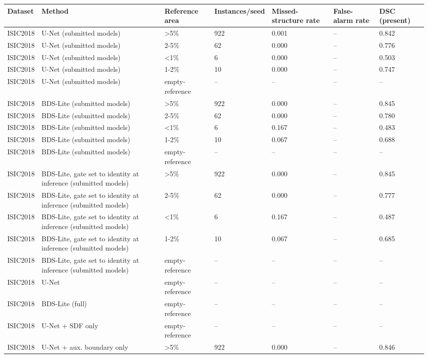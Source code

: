 \begin{tabular}{lllllll}
\toprule
Dataset & Method & Reference area & Instances/seed & Missed-structure rate & False-alarm rate & DSC (present) \\
\midrule
ISIC2018 & U-Net (submitted models) & >5\% & 922 & 0.001 & -- & 0.842 \\
ISIC2018 & U-Net (submitted models) & 2-5\% & 62 & 0.000 & -- & 0.776 \\
ISIC2018 & U-Net (submitted models) & <1\% & 6 & 0.000 & -- & 0.503 \\
ISIC2018 & U-Net (submitted models) & 1-2\% & 10 & 0.000 & -- & 0.747 \\
ISIC2018 & U-Net (submitted models) & empty-reference & -- & -- & -- & -- \\
ISIC2018 & BDS-Lite (submitted models) & >5\% & 922 & 0.000 & -- & 0.845 \\
ISIC2018 & BDS-Lite (submitted models) & 2-5\% & 62 & 0.000 & -- & 0.780 \\
ISIC2018 & BDS-Lite (submitted models) & <1\% & 6 & 0.167 & -- & 0.483 \\
ISIC2018 & BDS-Lite (submitted models) & 1-2\% & 10 & 0.067 & -- & 0.688 \\
ISIC2018 & BDS-Lite (submitted models) & empty-reference & -- & -- & -- & -- \\
ISIC2018 & BDS-Lite, gate set to identity at inference (submitted models) & >5\% & 922 & 0.000 & -- & 0.845 \\
ISIC2018 & BDS-Lite, gate set to identity at inference (submitted models) & 2-5\% & 62 & 0.000 & -- & 0.777 \\
ISIC2018 & BDS-Lite, gate set to identity at inference (submitted models) & <1\% & 6 & 0.167 & -- & 0.487 \\
ISIC2018 & BDS-Lite, gate set to identity at inference (submitted models) & 1-2\% & 10 & 0.067 & -- & 0.685 \\
ISIC2018 & BDS-Lite, gate set to identity at inference (submitted models) & empty-reference & -- & -- & -- & -- \\
ISIC2018 & U-Net & empty-reference & -- & -- & -- & -- \\
ISIC2018 & BDS-Lite (full) & empty-reference & -- & -- & -- & -- \\
ISIC2018 & U-Net + SDF only & empty-reference & -- & -- & -- & -- \\
ISIC2018 & U-Net + aux. boundary only & >5\% & 922 & 0.000 & -- & 0.846 \\

\end{tabular}

